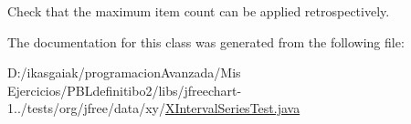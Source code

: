 Check that the maximum item count can be applied retrospectively. 

The documentation for this class was generated from the following file\+:\begin{DoxyCompactItemize}
\item 
D\+:/ikasgaiak/programacion\+Avanzada/\+Mis Ejercicios/\+P\+B\+Ldefinitibo2/libs/jfreechart-\/1../tests/org/jfree/data/xy/\mbox{\hyperlink{_x_interval_series_test_8java}{X\+Interval\+Series\+Test.\+java}}\end{DoxyCompactItemize}
